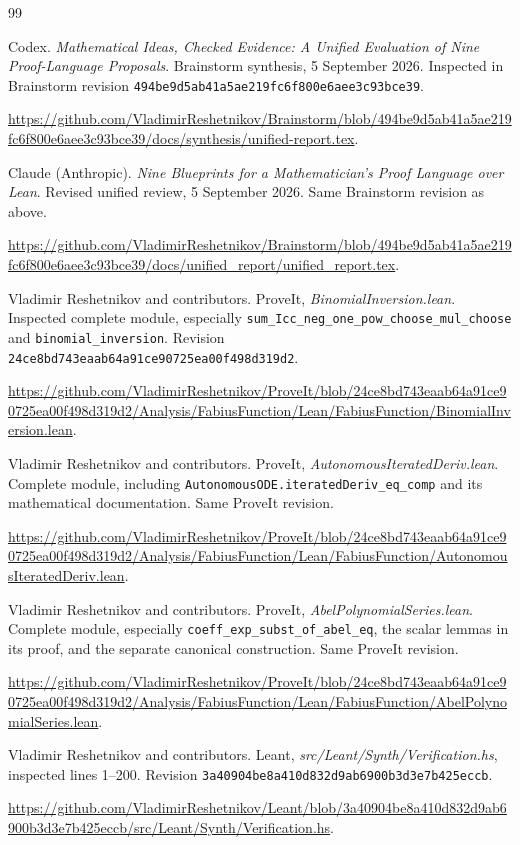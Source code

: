 \documentclass[11pt,a4paper]{article}
\newcommand{\code}[1]{\nolinkurl{#1}}
\theoremstyle{definition}
\begin{document}
\clearpage
{}
{}
\begin{thebibliography}{99}
\small\raggedright

 Codex. \emph{Mathematical Ideas, Checked Evidence: A Unified Evaluation of Nine Proof-Language Proposals}. Brainstorm synthesis, 5 September 2026. Inspected in Brainstorm revision \code{494be9d5ab41a5ae219fc6f800e6aee3c93bce39}.\par
\url{https://github.com/VladimirReshetnikov/Brainstorm/blob/494be9d5ab41a5ae219fc6f800e6aee3c93bce39/docs/synthesis/unified-report.tex}.

 Claude (Anthropic). \emph{Nine Blueprints for a Mathematician's Proof Language over Lean}. Revised unified review, 5 September 2026. Same Brainstorm revision as above.\par
\url{https://github.com/VladimirReshetnikov/Brainstorm/blob/494be9d5ab41a5ae219fc6f800e6aee3c93bce39/docs/unified_report/unified_report.tex}.

 Vladimir Reshetnikov and contributors. ProveIt, \emph{BinomialInversion.lean}. Inspected complete module, especially \code{sum_Icc_neg_one_pow_choose_mul_choose} and \code{binomial_inversion}. Revision \code{24ce8bd743eaab64a91ce90725ea00f498d319d2}.\par
\url{https://github.com/VladimirReshetnikov/ProveIt/blob/24ce8bd743eaab64a91ce90725ea00f498d319d2/Analysis/FabiusFunction/Lean/FabiusFunction/BinomialInversion.lean}.

 Vladimir Reshetnikov and contributors. ProveIt, \emph{AutonomousIteratedDeriv.lean}. Complete module, including \code{AutonomousODE.iteratedDeriv_eq_comp} and its mathematical documentation. Same ProveIt revision.\par
\url{https://github.com/VladimirReshetnikov/ProveIt/blob/24ce8bd743eaab64a91ce90725ea00f498d319d2/Analysis/FabiusFunction/Lean/FabiusFunction/AutonomousIteratedDeriv.lean}.

 Vladimir Reshetnikov and contributors. ProveIt, \emph{AbelPolynomialSeries.lean}. Complete module, especially \code{coeff_exp_subst_of_abel_eq}, the scalar lemmas in its proof, and the separate canonical construction. Same ProveIt revision.\par
\url{https://github.com/VladimirReshetnikov/ProveIt/blob/24ce8bd743eaab64a91ce90725ea00f498d319d2/Analysis/FabiusFunction/Lean/FabiusFunction/AbelPolynomialSeries.lean}.

 Vladimir Reshetnikov and contributors. Leant, \emph{src/Leant/Synth/Verification.hs}, inspected lines 1--200. Revision \code{3a40904be8a410d832d9ab6900b3d3e7b425eccb}.\par
\url{https://github.com/VladimirReshetnikov/Leant/blob/3a40904be8a410d832d9ab6900b3d3e7b425eccb/src/Leant/Synth/Verification.hs}.


\end{thebibliography}
\end{document}

